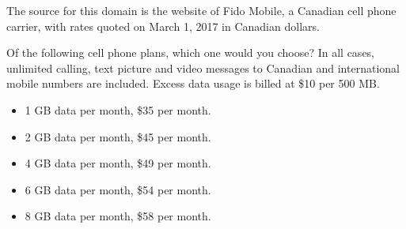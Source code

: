 
The source for this domain is the website of Fido Mobile, a Canadian cell phone carrier, with rates quoted on March 1, 2017 in Canadian dollars.

\begin{tcolorbox}
Of the following cell phone plans, which one would you choose? In all cases, unlimited calling, text picture and video messages to Canadian and international mobile numbers are included. Excess data usage is billed at \$10 per 500 MB.

\begin{itemize}
	\setlength\itemsep{-5pt}
	\item 1 GB data per month, \$35 per month.
	\item 2 GB data per month, \$45 per month.
	\item 4 GB data per month, \$49 per month.
	\item 6 GB data per month, \$54 per month.
	\item 8 GB data per month, \$58 per month.
\end{itemize}
\end{tcolorbox}
